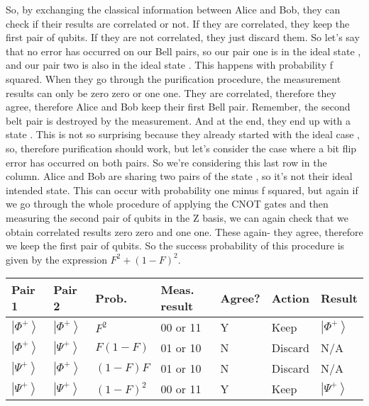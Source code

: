 So, by exchanging the classical information between Alice and Bob, they can check if their results are correlated or not. If they are correlated, they keep the first pair of qubits. If they are not correlated, they just discard them. So let's say that no error has occurred on our Bell pairs, so our pair one is in the ideal state  \ket{\Phi^+}, and our pair two is also in the ideal state  \ket{\Phi^+}. This happens with probability f squared. When they go through the purification procedure, the measurement results can only be zero zero or one one. They are correlated, therefore they agree, therefore Alice and Bob keep their first Bell pair. Remember, the second belt pair is destroyed by the measurement. And at the end, they end up with a state  \ket{\Phi^+}. This is not so surprising because they already started with the ideal case  \ket{\Phi^+}, so, therefore purification should work, but let's consider the case where a bit flip error has occurred on both pairs. So we're considering this last row in the column. Alice and Bob are sharing two pairs of the state \PsiPlus, so it's not their ideal intended state. This can occur with probability one minus f squared, but again if we go through the whole procedure of applying the CNOT gates and then measuring the second pair of qubits in the Z basis, we can again check that we obtain correlated results zero zero and one one. These again- they agree, therefore we keep the first pair of qubits. So the success probability of this procedure is given by the expression $F^2+(1-F)^2$.

\begin{tabular}{|l|l|l|l|l|l|l|}
\hline Pair 1 & Pair 2 & Prob. & Meas. result & Agree? & Action & Result \\
\hline$\left|\Phi^{+}\right\rangle$ & $\left|\Phi^{+}\right\rangle$ & $F^{2}$ & 00 or 11 & Y & Keep & $\left|\Phi^{+}\right\rangle$ \\
\hline$\left|\Phi^{+}\right\rangle$ & $\left|\Psi^{+}\right\rangle$ & $F(1-F)$ & 01 or 10 & N & Discard & N/A \\
\hline$\left|\Psi^{+}\right\rangle$ & $\left|\Phi^{+}\right\rangle$ & $(1-F) F$ & 01 or 10 & N & Discard & N/A \\
\hline$\left|\Psi^{+}\right\rangle$ & $\left|\Psi^{+}\right\rangle$ & $(1-F)^{2}$ & 00 or 11 & Y & Keep & $\left|\Psi^{+}\right\rangle$ \\
\hline
\end{tabular}

